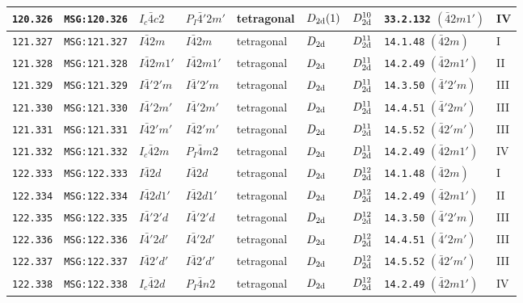\documentclass[fleqn,10pt]{jsarticle}
\begin{document}
\begin{center}
\begin{longtable}{lllllllll}
\texttt{120.326} & \texttt{MSG:120.326} & $I_{c}\bar{4}c2$ & $P_{I}\bar{4}'2m'$ & tetragonal & $D_{\rm 2d}(1)$ & $D_{\rm 2d}^{10}$ & \texttt{33.2.132} $(\bar{4}2m1')$ & IV \\ \hline
\texttt{121.327} & \texttt{MSG:121.327} & $I\bar{4}2m$ & $I\bar{4}2m$ & tetragonal & $D_{\rm 2d}$ & $D_{\rm 2d}^{11}$ & \texttt{14.1.48} $(\bar{4}2m)$ & I \\
\texttt{121.328} & \texttt{MSG:121.328} & $I\bar{4}2m1'$ & $I\bar{4}2m1'$ & tetragonal & $D_{\rm 2d}$ & $D_{\rm 2d}^{11}$ & \texttt{14.2.49} $(\bar{4}2m1')$ & II \\
\texttt{121.329} & \texttt{MSG:121.329} & $I\bar{4}'2'm$ & $I\bar{4}'2'm$ & tetragonal & $D_{\rm 2d}$ & $D_{\rm 2d}^{11}$ & \texttt{14.3.50} $(\bar{4}'2'm)$ & III \\
\texttt{121.330} & \texttt{MSG:121.330} & $I\bar{4}'2m'$ & $I\bar{4}'2m'$ & tetragonal & $D_{\rm 2d}$ & $D_{\rm 2d}^{11}$ & \texttt{14.4.51} $(\bar{4}'2m')$ & III \\
\texttt{121.331} & \texttt{MSG:121.331} & $I\bar{4}2'm'$ & $I\bar{4}2'm'$ & tetragonal & $D_{\rm 2d}$ & $D_{\rm 2d}^{11}$ & \texttt{14.5.52} $(\bar{4}2'm')$ & III \\
\texttt{121.332} & \texttt{MSG:121.332} & $I_{c}\bar{4}2m$ & $P_{I}\bar{4}m2$ & tetragonal & $D_{\rm 2d}$ & $D_{\rm 2d}^{11}$ & \texttt{14.2.49} $(\bar{4}2m1')$ & IV \\ \hline
\texttt{122.333} & \texttt{MSG:122.333} & $I\bar{4}2d$ & $I\bar{4}2d$ & tetragonal & $D_{\rm 2d}$ & $D_{\rm 2d}^{12}$ & \texttt{14.1.48} $(\bar{4}2m)$ & I \\
\texttt{122.334} & \texttt{MSG:122.334} & $I\bar{4}2d1'$ & $I\bar{4}2d1'$ & tetragonal & $D_{\rm 2d}$ & $D_{\rm 2d}^{12}$ & \texttt{14.2.49} $(\bar{4}2m1')$ & II \\
\texttt{122.335} & \texttt{MSG:122.335} & $I\bar{4}'2'd$ & $I\bar{4}'2'd$ & tetragonal & $D_{\rm 2d}$ & $D_{\rm 2d}^{12}$ & \texttt{14.3.50} $(\bar{4}'2'm)$ & III \\
\texttt{122.336} & \texttt{MSG:122.336} & $I\bar{4}'2d'$ & $I\bar{4}'2d'$ & tetragonal & $D_{\rm 2d}$ & $D_{\rm 2d}^{12}$ & \texttt{14.4.51} $(\bar{4}'2m')$ & III \\
\texttt{122.337} & \texttt{MSG:122.337} & $I\bar{4}2'd'$ & $I\bar{4}2'd'$ & tetragonal & $D_{\rm 2d}$ & $D_{\rm 2d}^{12}$ & \texttt{14.5.52} $(\bar{4}2'm')$ & III \\
\texttt{122.338} & \texttt{MSG:122.338} & $I_{c}\bar{4}2d$ & $P_{I}\bar{4}n2$ & tetragonal & $D_{\rm 2d}$ & $D_{\rm 2d}^{12}$ & \texttt{14.2.49} $(\bar{4}2m1')$ & IV \\ \hline

\end{longtable}
\end{center}
\end{document}
